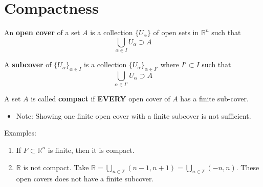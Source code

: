 \documentclass[a4paper]{article}
\numberwithin{equation}{section}
\newcommand{\R}{\mathbb{R}}
\newcommand{\Z}{\mathbb{Z}}
\begin{document}
\section{Compactness}
\begin{definition}
    An \textbf{open cover} of a set $A$ is a collection $\{U_\alpha\}$ of open sets in $\R^n$ such that 
    \begin{equation}
        \bigcup_{\alpha\in I}U_\alpha\supset A
    \end{equation}

    A \textbf{subcover} of $\{U_\alpha\}_{\alpha\in I}$ is a collection $\{U_\alpha\}_{\alpha\in I'}$ where $I'\subset I$ such that 
    \begin{equation}
        \bigcup_{\alpha\in I'}U_\alpha\supset A
    \end{equation}
\end{definition}
\begin{definition}
    A set $A$ is called \textbf{compact} if \textbf{EVERY} open cover of $A$ has a finite sub-cover.
    \begin{itemize}
        \item Note: Showing one finite open cover with a finite subcover is not sufficient.
    \end{itemize}
    Examples:
    \begin{enumerate}
        \item If $F\subset\R^n$ is finite, then it is compact.
        \item $\R$ is not compact. Take $\R=\bigcup_{n\in\Z}(n-1,n+1)=\bigcup_{n\in\Z}(-n,n)$. These open covers does not have a finite subcover.
    \end{enumerate}
\end{definition}
\end{document}
